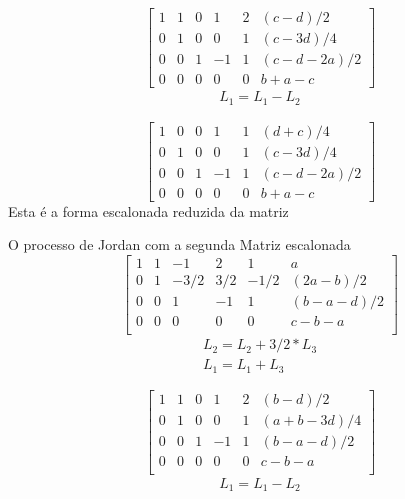 \documentclass{beamer}
\begin{document}
\begin{frame}{}
  $$
  \left[ \begin{array}{ccccc|c}
     1 & 1 & 0 & 1 & 2 & (c-d)/2 \\ 
     0 & 1 & 0 & 0 & 1 & (c-3d)/4\\
    0 & 0 & 1 & -1 & 1 & (c -d-2a)/2 \\
     0 & 0 & 0 &0 & 0 & b +a -c 
  \end{array}\right]$$
  \begin{gather*}
    L_1 = L_1 - L_2
  \end{gather*}
\end{frame}

\begin{frame}{}
  $$
  \left[ \begin{array}{ccccc|c}
     1 & 0 & 0 & 1 & 1 & (d+c)/4 \\ 
     0 & 1 & 0 & 0 & 1 & (c-3d)/4\\
    0 & 0 & 1 & -1 & 1 & (c -d-2a)/2 \\
     0 & 0 & 0 &0 & 0 & b +a -c 
  \end{array}\right]$$
  Esta é a forma escalonada reduzida da matriz
\end{frame}

\begin{frame}{O processo de Jordan com a segunda Matriz escalonada}
  $$
  \left[ \begin{array}{ccccc|c}
    {1} & 1 & -1 & 2 & 1 & a \\ 
     0 & {1} & -3/2 &3/2 & -1/2 & (2a-b)/2 \\
     0 & 0 & {1} & -1 & 1 & (b - a -d)/2 \\
     0 & 0 & 0 & 0 & 0 & c-b-a \\
    \end{array}\right]
  $$
\begin{gather*}
  L_2 =L_2 + 3/2*L_3 \\
  L_1 =L_1 + L_3
\end{gather*}

\end{frame}


\begin{frame}
  $$
  \left[ \begin{array}{ccccc|c}
    {1} & 1 & 0 & 1 & 2 & (b-d)/2 \\ 
     0 & {1} & 0 &0 & 1 & (a+b-3d)/4 \\
     0 & 0 & {1} & -1 & 1 & (b - a -d)/2 \\
     0 & 0 & 0 & 0 & 0 & c-b-a \\
    \end{array}\right]
  $$
\begin{gather*}
  L_1 =L_1 - L_2
\end{gather*}

\end{frame}
\end{document}
